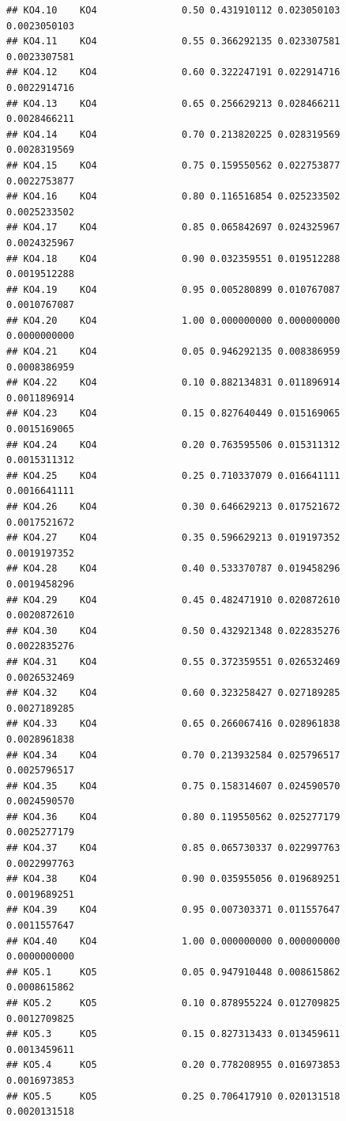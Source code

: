 \documentclass[
]{book}
\begin{document}
\begin{verbatim}
## KO4.10    KO4               0.50 0.431910112 0.023050103 0.0023050103
## KO4.11    KO4               0.55 0.366292135 0.023307581 0.0023307581
## KO4.12    KO4               0.60 0.322247191 0.022914716 0.0022914716
## KO4.13    KO4               0.65 0.256629213 0.028466211 0.0028466211
## KO4.14    KO4               0.70 0.213820225 0.028319569 0.0028319569
## KO4.15    KO4               0.75 0.159550562 0.022753877 0.0022753877
## KO4.16    KO4               0.80 0.116516854 0.025233502 0.0025233502
## KO4.17    KO4               0.85 0.065842697 0.024325967 0.0024325967
## KO4.18    KO4               0.90 0.032359551 0.019512288 0.0019512288
## KO4.19    KO4               0.95 0.005280899 0.010767087 0.0010767087
## KO4.20    KO4               1.00 0.000000000 0.000000000 0.0000000000
## KO4.21    KO4               0.05 0.946292135 0.008386959 0.0008386959
## KO4.22    KO4               0.10 0.882134831 0.011896914 0.0011896914
## KO4.23    KO4               0.15 0.827640449 0.015169065 0.0015169065
## KO4.24    KO4               0.20 0.763595506 0.015311312 0.0015311312
## KO4.25    KO4               0.25 0.710337079 0.016641111 0.0016641111
## KO4.26    KO4               0.30 0.646629213 0.017521672 0.0017521672
## KO4.27    KO4               0.35 0.596629213 0.019197352 0.0019197352
## KO4.28    KO4               0.40 0.533370787 0.019458296 0.0019458296
## KO4.29    KO4               0.45 0.482471910 0.020872610 0.0020872610
## KO4.30    KO4               0.50 0.432921348 0.022835276 0.0022835276
## KO4.31    KO4               0.55 0.372359551 0.026532469 0.0026532469
## KO4.32    KO4               0.60 0.323258427 0.027189285 0.0027189285
## KO4.33    KO4               0.65 0.266067416 0.028961838 0.0028961838
## KO4.34    KO4               0.70 0.213932584 0.025796517 0.0025796517
## KO4.35    KO4               0.75 0.158314607 0.024590570 0.0024590570
## KO4.36    KO4               0.80 0.119550562 0.025277179 0.0025277179
## KO4.37    KO4               0.85 0.065730337 0.022997763 0.0022997763
## KO4.38    KO4               0.90 0.035955056 0.019689251 0.0019689251
## KO4.39    KO4               0.95 0.007303371 0.011557647 0.0011557647
## KO4.40    KO4               1.00 0.000000000 0.000000000 0.0000000000
## KO5.1     KO5               0.05 0.947910448 0.008615862 0.0008615862
## KO5.2     KO5               0.10 0.878955224 0.012709825 0.0012709825
## KO5.3     KO5               0.15 0.827313433 0.013459611 0.0013459611
## KO5.4     KO5               0.20 0.778208955 0.016973853 0.0016973853
## KO5.5     KO5               0.25 0.706417910 0.020131518 0.0020131518

\end{verbatim}
\end{document}
